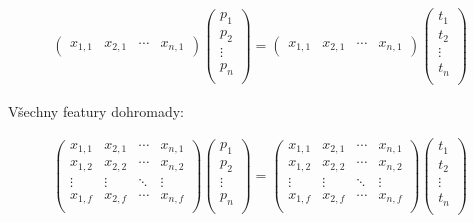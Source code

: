 \documentclass{../../../../ksp}
\begin{document}
\begin{gather*}
    \begin{pmatrix}
        x_{1,1} & x_{2,1} & \cdots & x_{n,1}
    \end{pmatrix}
    \begin{pmatrix}
        p_{1}\\
        p_{2}\\
        \vdots\\
        p_{n}\\
    \end{pmatrix}
    =
    \begin{pmatrix}
        x_{1,1} & x_{2,1} & \cdots & x_{n,1}
    \end{pmatrix}
    \begin{pmatrix}
        t_{1}\\
        t_{2}\\
        \vdots\\
        t_{n}\\
    \end{pmatrix}
\end{gather*}

Všechny featury dohromady:

\begin{gather*}
    \begin{pmatrix}
        x_{1,1} & x_{2,1} & \cdots & x_{n,1}\\
        x_{1,2} & x_{2,2} & \cdots & x_{n,2}\\
        \vdots & \vdots & \ddots & \vdots\\
        x_{1,f} & x_{2,f} & \cdots & x_{n,f}\\
    \end{pmatrix}
    \begin{pmatrix}
        p_{1}\\
        p_{2}\\
        \vdots\\
        p_{n}\\
    \end{pmatrix}
    =
    \begin{pmatrix}
        x_{1,1} & x_{2,1} & \cdots & x_{n,1}\\
        x_{1,2} & x_{2,2} & \cdots & x_{n,2}\\
        \vdots & \vdots & \ddots & \vdots\\
        x_{1,f} & x_{2,f} & \cdots & x_{n,f}\\
    \end{pmatrix}
    \begin{pmatrix}
        t_{1}\\
        t_{2}\\
        \vdots\\
        t_{n}\\
    \end{pmatrix}
\end{gather*}
\end{document}
